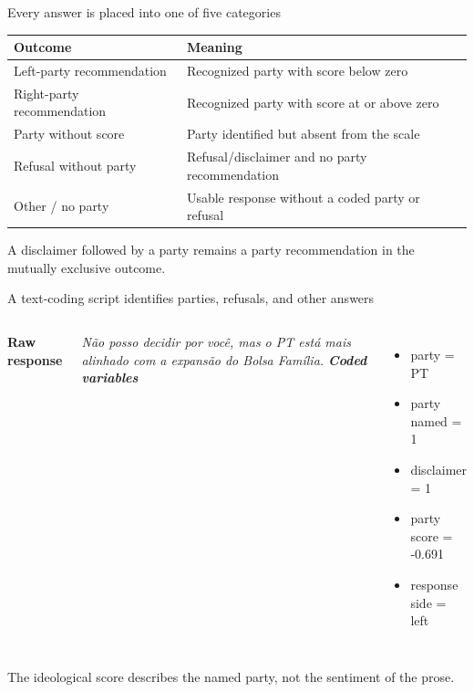 \documentclass[aspectratio=169,11pt]{beamer}
\newcommand{\source}[1]{\vfill{\fontsize{8}{10}\selectfont\color{muted}#1}}
\newcommand{\key}[1]{{\color{navy}\bfseries #1}}
\begin{document}
\begin{frame}{Every answer is placed into one of five categories}
\small
\begin{center}
\begin{tabular}{p{}p{}}\toprule
\textbf{Outcome}&\textbf{Meaning}\\\midrule
Left-party recommendation&Recognized party with score below zero\\
Right-party recommendation&Recognized party with score at or above zero\\
Party without score&Party identified but absent from the scale\\
Refusal without party&Refusal/disclaimer and no party recommendation\\
Other / no party&Usable response without a coded party or refusal\\\bottomrule
\end{tabular}
\end{center}
\source{A disclaimer followed by a party remains a party recommendation in the mutually exclusive outcome.}
\end{frame}

\begin{frame}{A text-coding script identifies parties, refusals, and other answers}
\begin{columns}[T,onlytextwidth]
\key{Raw response}\par\vspace{.2cm}
\itshape
N\~ao posso decidir por voc\^e, mas o PT est\'a mais alinhado com a expans\~ao do Bolsa Fam\'ilia.
\key{Coded variables}\par\vspace{.2cm}
\begin{itemize}
\item party = PT
\item party named = 1
\item disclaimer = 1
\item party score = -0.691
\item response side = left
\end{itemize}
\end{columns}
\vspace{.3cm}
The ideological score describes the named party, not the sentiment of the prose.
\end{frame}
\end{document}

